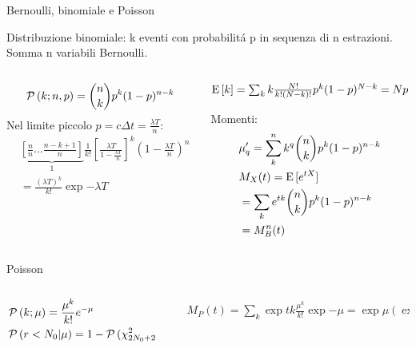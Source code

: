 \begin{frame}{Bernoulli, binomiale e Poisson}
\begin{block}{Distribuzione binomiale: k eventi con probabilit\'a p in sequenza di n estrazioni. Somma n variabili Bernoulli.}
\begin{columns}[T]
\begin{column}{0.5\textwidth}
\[\operatorname{\mathcal{P}}{(k;n,p)}=\binom{n}{k}p^k(1-p)^{n-k}\]
Nel limite piccolo $p=c\Delta t=\frac{\lambda T}{n}$:
\begin{align*}
&\underbrace{[\frac{n}{n}\ldots\frac{n-k+1}{n}]}_{1}\frac{1}{k!}[\frac{\lambda T}{1-\frac{\lambda T}{n}}]^k(1-\frac{\lambda T}{n})^n\\
&=\frac{(\lambda T)^k}{k!}\exp{-\lambda T}
\end{align*}
\end{column}
\begin{column}{0.5\textwidth}
$\operatorname{E}{[k]}=\sum_kk\frac{N!}{k!(N-k)!}p^k(1-p)^{N-k}=Np$

Momenti:
\begin{align*}
&\mu'_q=\sum_k^nk^q\binom{n}{k}p^k(1-p)^{n-k}\\
&M_X(t)=\operatorname{E}{[e^{tX}]}\\
&=\sum_ke^{tk}\binom{n}{k}p^k(1-p)^{n-k}\\
&=M_B^n(t)
\end{align*}
\end{column}
\end{columns}
\end{block}
\begin{block}{Poisson}
\begin{columns}[T]
\begin{column}{0.5\textwidth}
\begin{align*}
&\operatorname{\mathcal{P}}{(k;\mu)}=\frac{\mu^k}{k!}e^{-\mu}\\
&\operatorname{\mathcal{P}}{(r<N_0|\mu)}=1-\operatorname{\mathcal{P}}{(\chi^2_{2N_0+2}<2\mu)}
\end{align*}
\end{column}
\begin{column}{0.5\textwidth}
\begin{align*}
&M_P(t)=\sum_k\exp{tk}\frac{\mu^k}{k!}\exp{-\mu}=\exp{\mu(\exp{t}-1)}
\end{align*}
\end{column}
\end{columns}
\end{block}
\end{frame}

